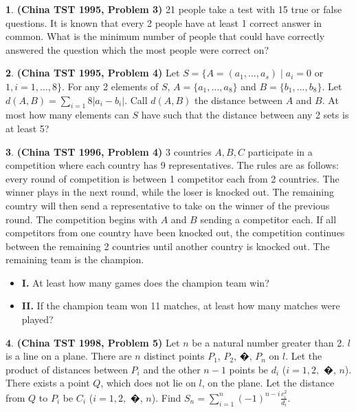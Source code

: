 \documentclass{article}
\theoremstyle{definition}
\newtheorem{p}{}
\begin{document}
\begin{p}{\bf(China TST 1995, Problem 3)}
21 people take a test with 15 true or false questions. It is known that every 2 people have at least 1 correct answer in common. What is the minimum number of people that could have correctly answered the question which the most people were correct on?
\end{p}



\begin{p}{\bf(China TST 1995, Problem 4)}
Let $S = \lbrace A = (a_1, \ldots, a_s) \mid a_i = 0$ or $1, i = 1, \ldots, 8 \rbrace$.  For any 2 elements of $S$, $A = \lbrace a_1, \ldots, a_8\rbrace$ and $B = \lbrace b_1, \ldots, b_8\rbrace$.  Let $d(A,B) = \sum_{i=1}{8} |a_i - b_i|$. Call $d(A,B)$ the distance between $A$ and $B$.  At most how many elements can $S$ have such that the distance between any 2 sets is at least 5?
\end{p}





\begin{p}{\bf(China TST 1996, Problem 4)}
3 countries $A, B, C$ participate in a competition where each country has 9 representatives.  The rules are as follows: every round of competition is between 1 competitor each from 2 countries.  The winner plays in the next round, while the loser is knocked out.  The remaining country will then send a representative to take on the winner of the previous round. The competition begins with $A$ and $B$ sending a competitor each.  If all competitors from one country have been knocked out, the competition continues between the remaining 2 countries until another country is knocked out.  The remaining team is the champion.

\begin{itemize}

\item {\bf I.} At least how many games does the champion team win?

\item {\bf II.} If the champion team won 11 matches, at least how many matches were played?
\end{itemize}
\end{p}




\begin{p}{\bf(China TST 1998, Problem 5)}
Let $n$ be a natural number greater than 2. $l$ is a line on a plane. There are $n$ distinct points $P_1$, $P_2$, �, $P_n$ on $l$. Let the product of distances between $P_i$ and the other $n-1$ points be $d_i$ ($i = 1, 2,$ �, $n$). There exists a point $Q$, which does not lie on $l$, on the plane. Let the distance from $Q$ to $P_i$ be $C_i$ ($i = 1, 2,$ �, $n$). Find $S_n = \sum_{i = 1}^{n} (-1)^{n-i} \frac{c_i^2}{d_i}$.
\end{p}
\end{document}
